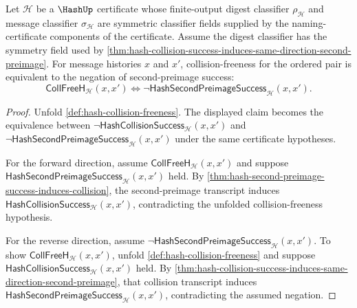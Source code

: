 \begin{theorem}
\label{thm:hash-resistance-equivalence-negation-boundary}
Let $\mathcal H$ be a $\HashUp$ certificate whose finite-output digest classifier $\rho_{\mathcal H}$ and message classifier $\sigma_{\mathcal H}$ are symmetric classifier fields supplied by the naming-certificate components of the certificate. Assume the digest classifier has the symmetry field used by \autoref{thm:hash-collision-success-induces-same-direction-second-preimage}. For message histories $x$ and $x'$, collision-freeness for the ordered pair is equivalent to the negation of second-preimage success:
$$
\mathsf{CollFreeH}_{\mathcal H}(x,x')
\Longleftrightarrow
\neg\mathsf{HashSecondPreimageSuccess}_{\mathcal H}(x,x').
$$
\end{theorem}
\begin{proof}
Unfold \autoref{def:hash-collision-freeness}. The displayed claim becomes the equivalence between $\neg\mathsf{HashCollisionSuccess}_{\mathcal H}(x,x')$ and $\neg\mathsf{HashSecondPreimageSuccess}_{\mathcal H}(x,x')$ under the same certificate hypotheses.

For the forward direction, assume $\mathsf{CollFreeH}_{\mathcal H}(x,x')$ and suppose $\mathsf{HashSecondPreimageSuccess}_{\mathcal H}(x,x')$ held. By \autoref{thm:hash-second-preimage-success-induces-collision}, the second-preimage transcript induces $\mathsf{HashCollisionSuccess}_{\mathcal H}(x,x')$, contradicting the unfolded collision-freeness hypothesis.

For the reverse direction, assume $\neg\mathsf{HashSecondPreimageSuccess}_{\mathcal H}(x,x')$. To show $\mathsf{CollFreeH}_{\mathcal H}(x,x')$, unfold \autoref{def:hash-collision-freeness} and suppose $\mathsf{HashCollisionSuccess}_{\mathcal H}(x,x')$ held. By \autoref{thm:hash-collision-success-induces-same-direction-second-preimage}, that collision transcript induces $\mathsf{HashSecondPreimageSuccess}_{\mathcal H}(x,x')$, contradicting the assumed negation.
\end{proof}

